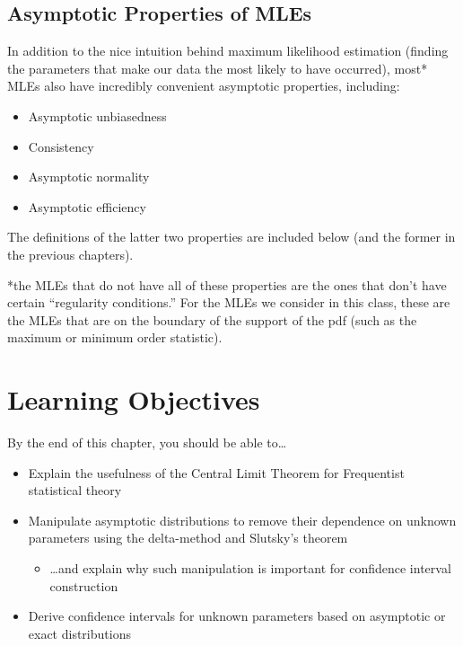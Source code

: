 \documentclass[
  letterpaper,
  DIV=11,
  numbers=noendperiod]{scrreprt}
\providecommand{\tightlist}{%
  \setlength{\itemsep}{0pt}\setlength{\parskip}{0pt}}\usepackage{longtable,booktabs,array}
\begin{document}
\subsection*{Asymptotic Properties of
MLEs}\label{asymptotic-properties-of-mles}

In addition to the nice intuition behind maximum likelihood estimation
(finding the parameters that make our data the most likely to have
occurred), most* MLEs also have incredibly convenient asymptotic
properties, including:

\begin{itemize}
\item
  Asymptotic unbiasedness
\item
  Consistency
\item
  Asymptotic normality
\item
  Asymptotic efficiency
\end{itemize}

The definitions of the latter two properties are included below (and the
former in the previous chapters).

*the MLEs that do not have all of these properties are the ones that
don't have certain ``regularity conditions.'' For the MLEs we consider
in this class, these are the MLEs that are on the boundary of the
support of the pdf (such as the maximum or minimum order statistic).

\section{Learning Objectives}\label{learning-objectives-5}

By the end of this chapter, you should be able to\ldots{}

\begin{itemize}
\item
  Explain the usefulness of the Central Limit Theorem for Frequentist
  statistical theory
\item
  Manipulate asymptotic distributions to remove their dependence on
  unknown parameters using the delta-method and Slutsky's theorem

  \begin{itemize}
  \tightlist
  \item
    \ldots and explain why such manipulation is important for confidence
    interval construction
  \end{itemize}
\item
  Derive confidence intervals for unknown parameters based on asymptotic
  or exact distributions
\end{itemize}
\end{document}
